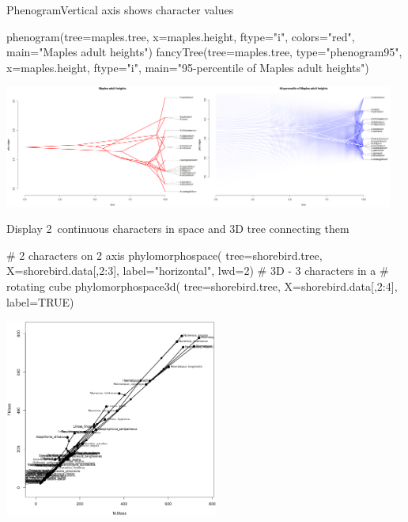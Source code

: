 \documentclass[compress, ucs, xelatex, 11pt, xcolor=svgnames, aspectratio=169,
	hyperref={
		bookmarks=true,
		unicode=true,
		colorlinks=true,
		pdftitle={Molecular data in R},
		plainpages=false,
		pdfauthor={Vojtech Zeisek},
		pdfsubject={Course about phylogeny and evolution in R},
		pdfcreator={XeLaTeX},
		pdfkeywords={R, evolution, phylogeny, molecular data},
		linkcolor=Crimson, %
		anchorcolor=Magenta, %
		citecolor=Magenta, %
		filecolor=Magenta, %
		menucolor=Magenta, %
		urlcolor=DodgerBlue, %
		pdftex},
	url={hyphens, lowtilde} %
	]{beamer}
\begin{document}
\begin{frame}[fragile]{Phenogram}{Vertical axis shows character values}
	\begin{spluscode}
    phenogram(tree=maples.tree, x=maples.height, ftype="i", colors="red",
      main="Maples adult heights")
    fancyTree(tree=maples.tree, type="phenogram95", x=maples.height,
      ftype="i", main="95-percentile of Maples adult heights")
	\end{spluscode}
	\begin{center}
		\includegraphics[height=4cm]{phenogram.png}
	\end{center}
\end{frame}

\begin{frame}[fragile]{Display 2~continuous characters in space and 3D tree connecting them}
	\begin{multicols}{2}
		\begin{spluscode}
    # 2 characters on 2 axis
    phylomorphospace(
      tree=shorebird.tree,
      X=shorebird.data[,2:3],
      label="horizontal", lwd=2)
    # 3D - 3 characters in a
    # rotating cube
    phylomorphospace3d(
      tree=shorebird.tree,
      X=shorebird.data[,2:4],
      label=TRUE)
		\end{spluscode}
		\begin{center}
			\includegraphics[height=6.5cm]{phylomorphospace.png}
		\end{center}
	\end{multicols}
\end{frame}
\end{document}
